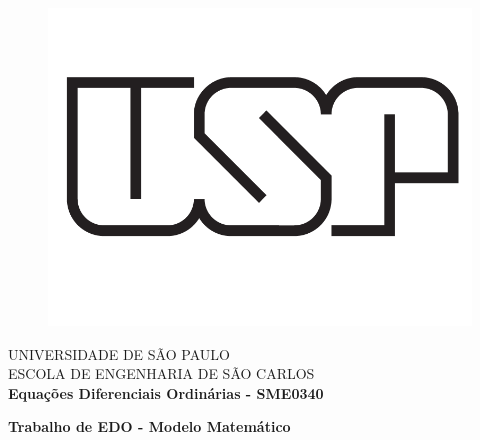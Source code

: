\thispagestyle{empty}

\begin{figure}
  \centering
  \includegraphics[scale=0.2]{images/titlepage.png} %
  \vspace*{-0.3cm}
\end{figure}


\begin{center}
    \vspace*{-2cm}
\MakeUppercase{\Large{Universidade de São Paulo}} \\
\MakeUppercase{\Large{Escola de Engenharia de São Carlos}}\\
{\large \rm \textbf {Equações Diferenciais Ordinárias - SME0340} \linebreak} %
\end{center}

\baselineskip 30pt

\vspace*{0.3cm}

\begin{center}
    {\LARGE \bfseries Trabalho de EDO - Modelo Matemático} %
\end{center}

